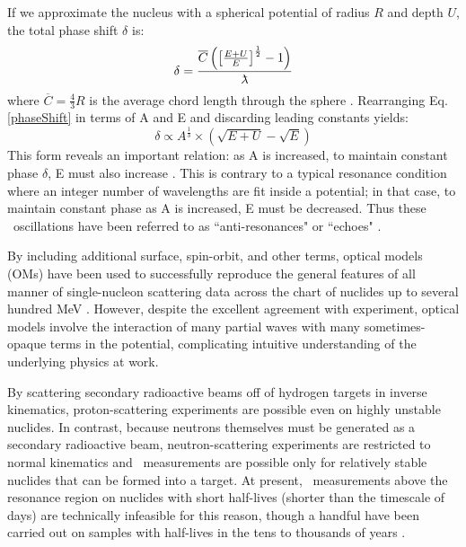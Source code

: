 \begin{eqation}
If we approximate the nucleus with a
spherical potential of radius $R$ and depth $U$, the total phase shift $\delta$ is:
\begin{equation} \label{phaseShift}
    \delta =
    \frac{\overline{C}\left(\left[{\frac{E+U}{E}}\right]^{\frac{1}{2}}-1\right)}{\lambdabar}
\end{equation}
where $\overline{C} = \frac{4}{3}R$ is the average chord length through the
sphere \cite{Angeli1970}. Rearranging Eq. \ref{phaseShift} in terms of A and E and
discarding leading constants yields:
\begin{equation}
    \delta \propto A^{\frac{1}{3}}\times\left(\sqrt{E+U}-\sqrt{E}\right)
\end{equation}
This form reveals an important relation: as A is increased, to maintain constant 
phase $\delta$, E must also increase \cite{Satchler1980, Peterson1962}. 
This is contrary to a typical resonance condition where an integer number of wavelengths
are fit inside a potential; in that case, to maintain constant phase as A is increased,
E must be decreased. Thus these \tot\ oscillations have been referred to as
``anti-resonances" or ``echoes" \cite{Satchler1980, McVoy1967}.

By including additional surface, spin-orbit, and other terms, optical models (OMs) have been 
used to successfully reproduce the general features of all manner of single-nucleon scattering 
data across the chart of nuclides up to several hundred MeV \cite{CH89}. 
However, despite the excellent agreement with experiment, optical models
involve the interaction of many partial waves with many sometimes-opaque terms
in the potential, complicating intuitive understanding of the underlying
physics at work.

By scattering secondary radioactive beams off of hydrogen targets in inverse
kinematics, proton-scattering experiments are possible even on highly unstable
nuclides. In contrast, because neutrons themselves must be generated as a
secondary radioactive beam, neutron-scattering experiments are restricted to
normal kinematics and \tot\ measurements are possible only for relatively stable
nuclides that can be formed into a target. At present, \tot\ measurements above
the resonance region on nuclides with short half-lives (shorter than the timescale of
days) are technically infeasible for this reason, though a handful have been carried out on
samples with half-lives in the tens to thousands of years \cite{Poenitz1983,
Phillips1980, Foster1971}.


\end{eqation}

